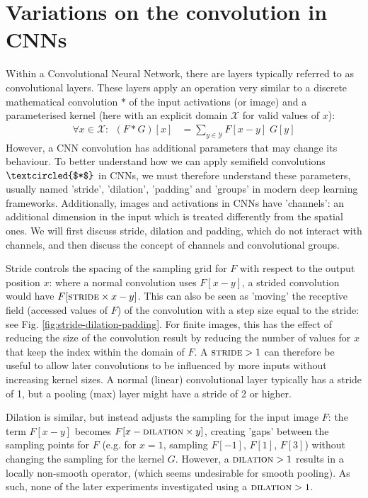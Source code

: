 \documentclass[a4paper, 12pt]{report}
\begin{document}
\section{Variations on the convolution in CNNs}
Within a Convolutional Neural Network, there are layers typically referred to as convolutional layers. These layers apply an operation very similar to a discrete mathematical convolution $*$ of the input activations (or image) and a parameterised kernel (here with an explicit domain $\mathcal{X}$ for valid values of $x$):
\begin{align}
\forall x\in\mathcal{X}:~~(F*G)[x] &= \sum_{y\in\mathcal{Y}} F[x-y]\; G[y]
\end{align}
However, a CNN convolution has additional parameters that may change its behaviour. To better understand how we can apply semifield convolutions $\textcircled{$*$}$ in CNNs, we must therefore understand these parameters, usually named 'stride', 'dilation', 'padding'  and 'groups' in modern deep learning frameworks. Additionally, images and activations in CNNs have 'channels': an additional dimension in the input which is treated differently from the spatial ones. We will first discuss stride, dilation and padding, which do not interact with channels, and then discuss the concept of channels and convolutional groups.

Stride controls the spacing of the sampling grid for $F$ with respect to the output position $x$: where a normal convolution uses $F[x-y]$, a strided convolution would have $F[\textsc{stride}\times x - y]$. This can also be seen as 'moving' the receptive field (accessed values of $F$) of the convolution with a step size equal to the stride: see Fig. \ref{fig:stride-dilation-padding}. For finite images, this has the effect of reducing the size of the convolution result by reducing the number of values for $x$ that keep the index within the domain of $F$. A $\textsc{stride}>1$ can therefore be useful to allow later convolutions to be influenced by more inputs without increasing kernel sizes. A normal (linear) convolutional layer typically has a stride of 1, but a pooling (max) layer might have a stride of 2 or higher.

Dilation is similar, but instead adjusts the sampling for the input image $F$: the term $F[x-y]$ becomes $F[x-\textsc{dilation}\times y]$, creating 'gaps' between the sampling points for $F$ (e.g. for $x=1$, sampling $F[-1]$, $F[1]$, $F[3]$) without changing the sampling for the kernel $G$. However, a $\textsc{dilation}>1$ results in a locally non-smooth operator, (which seems undesirable for smooth pooling). As such, none of the later experiments investigated using a $\textsc{dilation}>1$.
\end{document}
